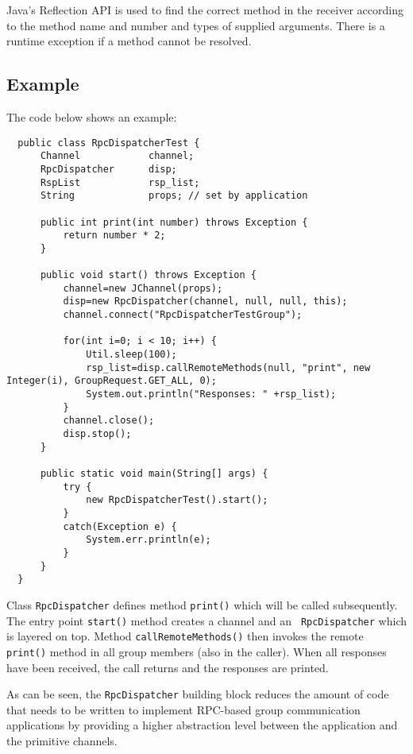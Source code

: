   Java's Reflection API is used to find the correct method in the receiver according
  to the method name and number and types of supplied arguments. There is a runtime
  exception if a method cannot be resolved.

    \subsection{Example}

    The code below shows an example:

    \begin{small}
    \begin{verbatim}
  public class RpcDispatcherTest {
      Channel            channel;
      RpcDispatcher      disp;
      RspList            rsp_list;
      String             props; // set by application

      public int print(int number) throws Exception {
          return number * 2;
      }

      public void start() throws Exception {
          channel=new JChannel(props);
          disp=new RpcDispatcher(channel, null, null, this);
          channel.connect("RpcDispatcherTestGroup");

          for(int i=0; i < 10; i++) {
              Util.sleep(100);
              rsp_list=disp.callRemoteMethods(null, "print", new Integer(i), GroupRequest.GET_ALL, 0);
              System.out.println("Responses: " +rsp_list);
          }
          channel.close();
          disp.stop();
      }

      public static void main(String[] args) {
          try {
              new RpcDispatcherTest().start();
          }
          catch(Exception e) {
              System.err.println(e);
          }
      }
  }
    \end{verbatim}
    \end{small}

    Class {\tt RpcDispatcher} defines method {\tt print()} which will be called
    subsequently. The entry point {\tt start()} method creates a channel and an {\tt
    RpcDispatcher} which is layered on top. Method {\tt callRemoteMethods()} then
    invokes the remote {\tt print()} method in all group members (also in the
    caller). When all responses have been received, the call returns and the
    responses are printed.

    As can be seen, the {\tt RpcDispatcher} building block reduces the amount of code
    that needs to be written to implement RPC-based group communication applications
    by providing a higher abstraction level between the application and the primitive
    channels.



